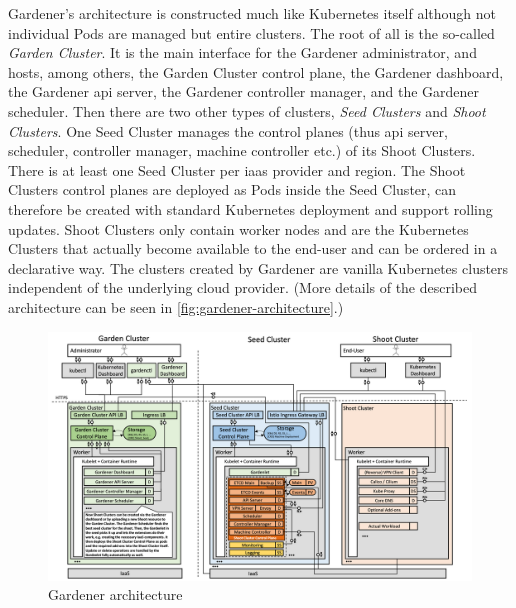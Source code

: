 Gardener's architecture is constructed much like Kubernetes itself although not individual Pods are managed but entire clusters.
The root of all is the so-called \emph{Garden Cluster}.
It is the main interface for the Gardener administrator, and hosts, among others, the Garden Cluster control plane, the Gardener dashboard, the Gardener \ac{api} server, the Gardener controller manager, and the Gardener scheduler.
Then there are two other types of clusters, \emph{Seed Clusters} and \emph{Shoot Clusters}.
One Seed Cluster manages the control planes (thus \ac{api} server, scheduler, controller manager, machine controller etc.) of its Shoot Clusters.
There is at least one Seed Cluster per \ac{iaas} provider and region.
The Shoot Clusters control planes are deployed as Pods inside the Seed Cluster, can therefore be created with standard Kubernetes deployment and support rolling updates.
Shoot Clusters only contain worker nodes and are the Kubernetes Clusters that actually become available to the end-user and can be ordered in a declarative way.
The clusters created by Gardener are vanilla Kubernetes clusters independent of the underlying cloud provider. \cite{gardener.blog2, wasistgardener}
(More details of the described architecture can be seen in \autoref{fig:gardener-architecture}.)

\begin{figure}[H]
    \centering
    \includegraphics[width=\textwidth]{Bilder/gardener-architecture-detailed.png}
    \caption{Gardener architecture \cite{gardener.architecture}}
    \label{fig:gardener-architecture}
\end{figure}

    
